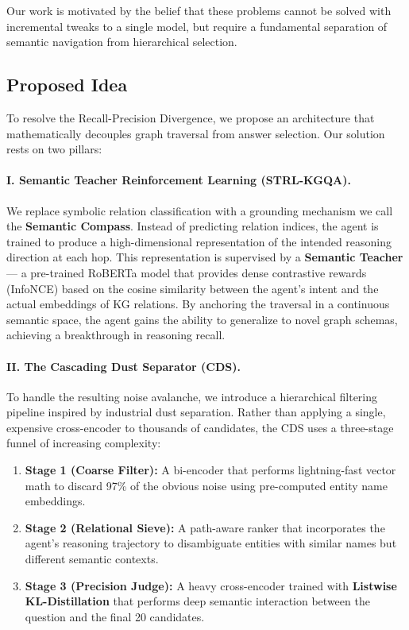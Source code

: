 \documentclass[11pt,a4paper]{article}
\newcommand{\STRL}{\textsc{STRL-KGQA}}
\newcommand{\CDS}{\textsc{CDS}}
\begin{document}
Our work is motivated by the belief that these problems cannot be solved with
incremental tweaks to a single model, but require a fundamental separation
of semantic navigation from hierarchical selection.

\subsection{Proposed Idea}
To resolve the Recall-Precision Divergence, we propose an architecture that
mathematically decouples graph traversal from answer selection. Our solution
rests on two pillars:

\paragraph{I. Semantic Teacher Reinforcement Learning (\STRL{}).}
We replace symbolic relation classification with a grounding mechanism we
call the \textbf{Semantic Compass}. 
Instead of predicting relation indices, the agent is trained to produce a
high-dimensional representation of the intended reasoning direction at each hop.
This representation is supervised by a \textbf{Semantic Teacher} --- a
pre-trained RoBERTa model that provides dense contrastive rewards (InfoNCE)
based on the cosine similarity between the agent's intent and the actual
embeddings of KG relations.
By anchoring the traversal in a continuous semantic space, the agent gains
the ability to generalize to novel graph schemas, achieving a breakthrough
in reasoning recall.

\paragraph{II. The Cascading Dust Separator (\CDS{}).}
To handle the resulting noise avalanche, we introduce a hierarchical filtering
pipeline inspired by industrial dust separation. 
Rather than applying a single, expensive cross-encoder to thousands of
candidates, the \CDS{} uses a three-stage funnel of increasing complexity:
\begin{enumerate}
  \item \textbf{Stage 1 (Coarse Filter):} A bi-encoder that performs
        lightning-fast vector math to discard 97\% of the obvious noise
        using pre-computed entity name embeddings.
  \item \textbf{Stage 2 (Relational Sieve):} A path-aware ranker that
        incorporates the agent's reasoning trajectory to disambiguate
        entities with similar names but different semantic contexts.
  \item \textbf{Stage 3 (Precision Judge):} A heavy cross-encoder trained
        with \textbf{Listwise KL-Distillation} that performs deep semantic
        interaction between the question and the final 20 candidates.
\end{enumerate}
\end{document}
